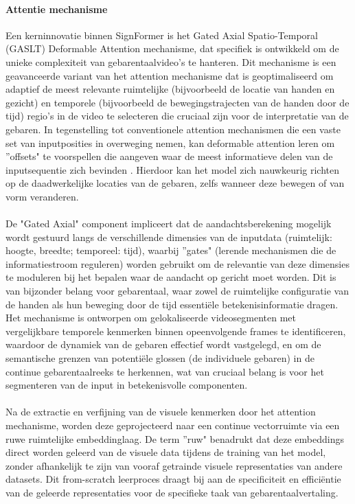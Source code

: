 \paragraph{Attentie mechanisme}
Een kerninnovatie binnen SignFormer is het Gated Axial Spatio-Temporal (GASLT) Deformable Attention mechanisme, dat specifiek is ontwikkeld om de unieke complexiteit van gebarentaalvideo's te hanteren. 
Dit mechanisme is een geavanceerde variant van het attention mechanisme \autocite{vaswani2017attentionneed} dat is geoptimaliseerd om adaptief de meest relevante ruimtelijke (bijvoorbeeld de locatie van handen en gezicht) en temporele (bijvoorbeeld de bewegingstrajecten van de handen door de tijd) regio's in de video te selecteren die cruciaal zijn voor de interpretatie van de gebaren. 
In tegenstelling tot conventionele attention mechanismen die een vaste set van inputposities in overweging nemen, kan deformable attention leren om ''offsets" \space te voorspellen die aangeven waar de meest informatieve delen van de inputsequentie zich bevinden \autocite{zhu2019deformable}. 
Hierdoor kan het model zich nauwkeurig richten op de daadwerkelijke locaties van de gebaren, zelfs wanneer deze bewegen of van vorm veranderen. 
\\
\\
De "Gated Axial" component impliceert dat de aandachtsberekening mogelijk wordt gestuurd langs de verschillende dimensies van de inputdata (ruimtelijk: hoogte, breedte; temporeel: tijd), waarbij ''gates" \space (lerende mechanismen die de informatiestroom reguleren) worden gebruikt om de relevantie van deze dimensies te moduleren bij het bepalen waar de aandacht op gericht moet worden. 
Dit is van bijzonder belang voor gebarentaal, waar zowel de ruimtelijke configuratie van de handen als hun beweging door de tijd essentiële betekenisinformatie dragen. 
Het mechanisme is ontworpen om gelokaliseerde videosegmenten met vergelijkbare temporele kenmerken binnen opeenvolgende frames te identificeren, waardoor de dynamiek van de gebaren effectief wordt vastgelegd, en om de semantische grenzen van potentiële glossen (de individuele gebaren) in de continue gebarentaalreeks te herkennen, wat van cruciaal belang is voor het segmenteren van de input in betekenisvolle componenten. 
\\
\\
Na de extractie en verfijning van de visuele kenmerken door het attention mechanisme, worden deze geprojecteerd naar een continue vectorruimte via een ruwe ruimtelijke embeddinglaag. 
De term ''ruw" \space benadrukt dat deze embeddings direct worden geleerd van de visuele data tijdens de training van het model, zonder afhankelijk te zijn van vooraf getrainde visuele representaties van andere datasets. 
Dit from-scratch leerproces draagt bij aan de specificiteit en efficiëntie van de geleerde representaties voor de specifieke taak van gebarentaalvertaling.

